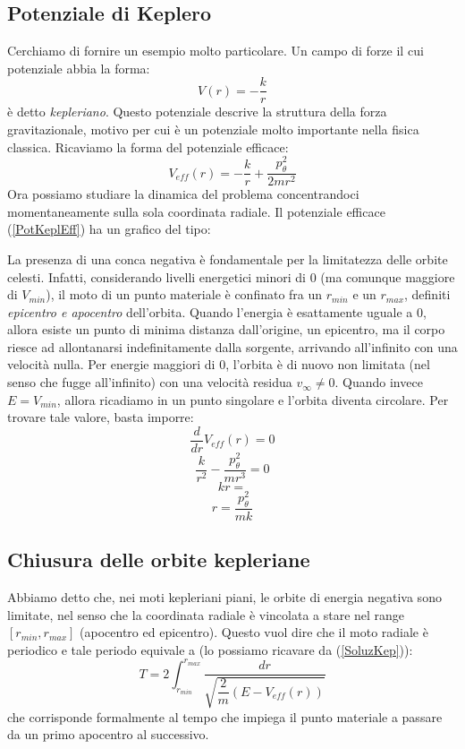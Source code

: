 \documentclass[a4paper,openany]{article}
\begin{document}
	\subsection{Potenziale di Keplero}
	Cerchiamo di fornire un esempio molto particolare. Un campo di forze il cui potenziale abbia la forma:
	\begin{equation}
		V(r) = -\dfrac{k}{r}
	\end{equation}
	è detto \textit{kepleriano}. Questo potenziale descrive la struttura della forza gravitazionale, motivo per cui è un potenziale molto importante nella fisica classica. Ricaviamo la forma del potenziale efficace:
	\begin{equation}
		V_{eff}(r) = -\dfrac{k}{r} + \dfrac{p_{\theta}^{2}}{2mr^{2}}
		\label{PotKeplEff}
	\end{equation}
	Ora possiamo studiare la dinamica del problema concentrandoci momentaneamente sulla sola coordinata radiale. Il potenziale efficace (\ref{PotKeplEff}) ha un grafico del tipo:
	\begin{figure}[H]
		\centering
	\end{figure}
	La presenza di una conca negativa è fondamentale per la limitatezza delle orbite celesti. Infatti, considerando livelli energetici minori di $0$ (ma comunque maggiore di $V_{min}$), il moto di un punto materiale è confinato fra un $r_{min}$ e un $r_{max}$, definiti \textit{epicentro e apocentro} dell'orbita. Quando l'energia è esattamente uguale a $0$, allora esiste un punto di minima distanza dall'origine, un epicentro, ma il corpo riesce ad allontanarsi indefinitamente dalla sorgente, arrivando all'infinito con una velocità nulla. Per energie maggiori di $0$, l'orbita è di nuovo non limitata (nel senso che fugge all'infinito) con una velocità residua $v_{\infty}\neq0$. Quando invece $E = V_{min}$, allora ricadiamo in un punto singolare e l'orbita diventa circolare. Per trovare tale valore, basta imporre:
	$$
	\dfrac{d}{dr}V_{eff}(r) = 0
	$$
	$$
	\dfrac{k}{r^2} - \dfrac{p_{\theta}^2}{mr^3}=0
	$$
	$$
	kr = 
	$$
	$$
	r =\dfrac{p_{\theta}^2}{mk}
	$$
	\subsection{Chiusura delle orbite kepleriane}
	Abbiamo detto che, nei moti kepleriani piani, le orbite di energia negativa sono limitate, nel senso che la coordinata radiale è vincolata a stare nel range $[r_{min},r_{max}]$ (apocentro ed epicentro). Questo vuol dire che il moto radiale è periodico e tale periodo equivale a (lo possiamo ricavare da (\ref{SoluzKep})):
	\begin{equation}
		T = 2\int_{r_{min}}^{r_{max}}\dfrac{dr}{\sqrt{\dfrac{2}{m}(E-V_{eff}(r))}}
		\label{PeriodoRadiale}
	\end{equation}
	che corrisponde formalmente al tempo che impiega il punto materiale a passare da un primo apocentro al successivo.
	
\end{document}
